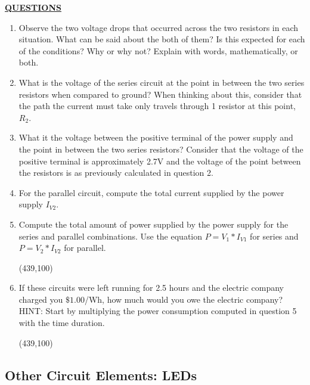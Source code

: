 \documentclass[12pt]{article}
\begin{document}
\textbf{\underline{QUESTIONS}}
\begin{enumerate}
    \item Observe the two voltage drops that occurred across the two resistors in each situation. What can be said about the both of them? Is this expected for each of the conditions? Why or why not? Explain with words, mathematically, or both.
        \fillwithlines{1in}
    
    \item What is the voltage of the series circuit at the point in between the two series resistors when compared to ground? When thinking about this, consider that the path the current must take only travels through 1 resistor at this point, $R_{2}$.
        \fillwithlines{0.3in}
        
    \item What it the voltage between the positive terminal of the power supply and the point in between the two series resistors? Consider that the voltage of the positive terminal is approximately 2.7V and the voltage of the point between the resistors is as previously calculated in question 2.
        \fillwithlines{0.3in}
        
    \item For the parallel circuit, compute the total current supplied by the power supply $I_{V2}$. 
        \fillwithlines{0.3in}
        
    \item Compute the total amount of power supplied by the power supply for the series and parallel combinations. Use the equation $P = V_{1} * I_{V1}$ for series and $P = V_{2} * I_{V2}$ for parallel.
       
         \framebox(439,100){}
        
    \item If these circuits were left running for 2.5 hours and the electric company charged you $\$1.00$/Wh, how much would you owe the electric company? HINT: Start by multiplying the power consumption computed in question 5 with the time duration.
       
         \framebox(439,100){}
\end{enumerate}

\checkoffsubsub

\subsection{Other Circuit Elements: LEDs}
\end{document}
